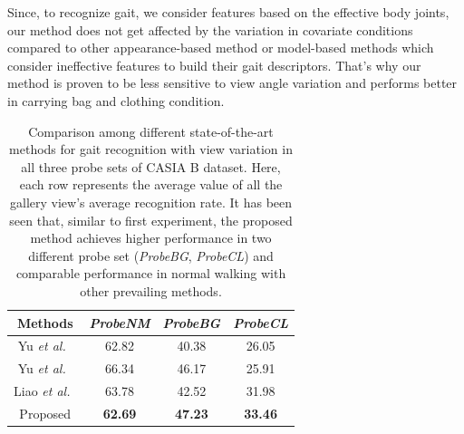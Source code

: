 Since, to recognize gait, we consider features based on the effective body joints, our method does not get affected by the variation in covariate conditions compared to other appearance-based method or model-based methods which consider ineffective features to build their gait descriptors. That's why our method is proven to be less sensitive to view angle variation and performs better in carrying bag and clothing condition. 

\begin{table}
	\centering
	\caption [Comparison among different state-of-the-art methods for gait recognition with view variation in all three probe sets of CASIA B dataset]
	{Comparison among different state-of-the-art methods for gait recognition with view variation in all three probe sets of CASIA B dataset. Here, each row represents the average value of all the gallery view's average recognition rate. It has been seen that, similar to first experiment, the proposed method achieves higher performance in two different probe set (\textit{ProbeBG}, \textit{ProbeCL}) and comparable performance in normal walking with other prevailing methods. \label{table:comp_casia_b_with_view}}
		
	{\begin{tabular*}{22pc}{cccc}\hline
				
				Methods &\textit{ProbeNM} &\textit{ProbeBG} &\textit{ProbeCL}\\
				\hline
				
				\noalign{\smallskip}
				Yu \textit{et al.}~\cite{Yu_17_spae} &62.82 &40.38 &26.05 \\ 
				
				
				\noalign{\smallskip}
				Yu \textit{et al.}~\cite{Yu_19} &66.34  &46.17  &25.91  \\
				
				\noalign{\smallskip}
				Liao \textit{et al.}~\cite{Liao_19}  &63.78  &42.52  &31.98  \\
				
				\noalign{\smallskip}
				Proposed &\textbf{62.69} &\textbf{47.23} &\textbf{33.46}\\
				\hline
\end{tabular*}}{}
\end{table}

